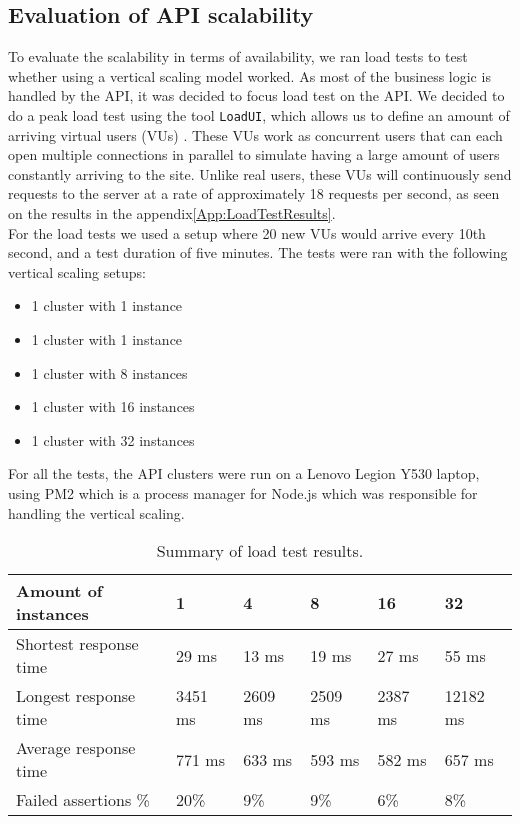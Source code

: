 \subsection{Evaluation of API scalability}
To evaluate the scalability in terms of availability, we ran load tests to test whether using a vertical scaling model worked.
As most of the business logic is handled by the API, it was decided to focus load test on the API.
We decided to do a peak load test using the tool \texttt{LoadUI}, which allows us to define an amount of arriving virtual users (VUs) \cite{loadimpactSource}. 
These VUs work as concurrent users that can each open multiple connections in parallel to simulate having a large amount of users constantly arriving to the site.
Unlike real users, these VUs will continuously send requests to the server at a rate of approximately 18 requests per second, as seen on the results in the appendix\autoref{App:LoadTestResults}.
\\
For the load tests we used a setup where 20 new VUs would arrive every 10th second, and a test duration of five minutes.
The tests were ran with the following vertical scaling setups:
\begin{itemize}
    \item 1 cluster with 1 instance
    \item 1 cluster with 1 instance
    \item 1 cluster with 8 instances
    \item 1 cluster with 16 instances
    \item 1 cluster with 32 instances
\end{itemize}
For all the tests, the API clusters were run on a Lenovo Legion Y530 laptop, using PM2 which is a process manager for Node.js which was responsible for handling the vertical scaling\cite{PM2}.

\begin{table}[]
    \begin{tabular}{|l|l|l|l|l|l|}
    \hline
    \textbf{Amount of instances} & \textbf{1} & \textbf{4} & \textbf{8} & \textbf{16} & \textbf{32} \\ \hline
    Shortest response time       & 29 ms      & 13 ms      & 19 ms      & 27 ms       & 55 ms       \\ \hline
    Longest response time        & 3451 ms    & 2609 ms    & 2509 ms    & 2387 ms     & 12182 ms    \\ \hline
    Average response time        & 771 ms     & 633 ms     & 593 ms     & 582 ms      & 657 ms      \\ \hline
    Failed assertions \%         & 20\%       & 9\%        & 9\%        & 6\%         & 8\%         \\ \hline
    \end{tabular}
    \caption{Summary of load test results.}
    \label{table:load-test-table}
\end{table}

